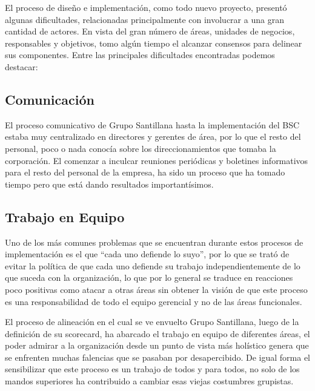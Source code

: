 \item {El proceso de diseño e implementación, como todo nuevo proyecto, presentó algunas dificultades, relacionadas principalmente con involucrar a una gran cantidad de actores. En vista del gran número de áreas, unidades de negocios, responsables y objetivos, tomo algún tiempo el alcanzar consensos para delinear sus componentes. Entre las principales dificultades encontradas podemos destacar:}

\subsection{Comunicación}
\item {El proceso comunicativo de Grupo Santillana hasta la implementación del BSC estaba muy centralizado en directores y gerentes de área, por lo que el resto del personal, poco o nada conocía sobre los direccionamientos que tomaba la corporación. El comenzar a inculcar reuniones periódicas y boletines informativos para el resto del personal de la empresa, ha sido un proceso que ha tomado tiempo pero que está dando resultados importantísimos.}

\subsection{Trabajo en Equipo}
\item {Uno de los más comunes problemas que se encuentran durante estos procesos de implementación es el que “cada uno defiende lo suyo”, por lo que se trató de evitar la política de que cada uno defiende su trabajo independientemente de lo que suceda con la organización, lo que por lo general se traduce en reacciones poco positivas como atacar a otras áreas sin obtener la visión de que este proceso es una responsabilidad de todo el equipo gerencial y no de las áreas funcionales.

El proceso de alineación en el cual se ve envuelto Grupo Santillana, luego de la definición de su scorecard,  ha abarcado el trabajo en equipo de diferentes áreas, el poder admirar a la organización desde un punto de vista más holístico genera que se enfrenten muchas falencias que se pasaban por desapercibido. De igual forma el sensibilizar que este proceso es un trabajo de todos y para todos, no solo de los mandos superiores ha contribuido a cambiar esas viejas costumbres grupistas.}

